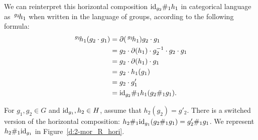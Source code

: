 \documentclass{tac}
\newcommand{\act}[1]{\,\sp{#1}\!}
\begin{document}
\begin{appendices}
We can reinterpret this horizontal composition ${\rm id}_{g_2} \#_1 h_1$ in categorical language as $\act{g_2}h_1$ when written in the language of groups, according to the following formula:
\begin{align*}
\act{g_2}h_1 (g_2\cdot g_1) &= \partial(\act{g_2}h_1 )g_2\cdot g_1\\
&= g_2 \cdot \partial(h_1) \cdot g_2^{-1} \cdot g_2 \cdot g_1\\
&= g_2 \cdot \partial(h_1) \cdot g_1\\
&= g_2 \cdot h_1(g_1)\\
&= g_2 \cdot g'_1 \\
&= {\rm id}_{g_2} \#_1 h_1 (g_2\#_1 g_1 ).
\end{align*}

For $g_1, g_2 \in G$ and $ {\rm id}_{g_1}, h_2\in H$, assume that $h_2(g_2) = g'_2$. There is a switched version of the horizontal composition:  $h_2 \#_1 {\rm id}_{g_1}  (g_2\#_1 g_1 ) = g'_2\#_1 g_1$. We represent $h_2 \#_1 {\rm id}_{g_1}$ in Figure~\ref{d:2-mor_R_hori}.


\end{appendices}
\end{document}
